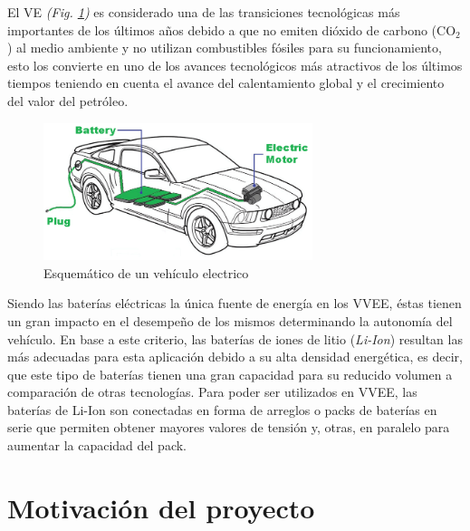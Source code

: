 \documentclass[10pt, a4paper]{report}
\begin{document}
\noindent El \acrfull{VE} \emph{(Fig. \ref{EV})} es considerado 
una de las transiciones tecnológicas más importantes de los últimos años 
debido a que no emiten dióxido de carbono ($\mathrm{CO_2}$) al medio 
ambiente y no utilizan combustibles fósiles para su funcionamiento, esto 
los convierte en uno de los avances tecnológicos más atractivos de los 
últimos tiempos teniendo en cuenta el avance del calentamiento global y el 
crecimiento del valor del petróleo.

\begin{figure}[h!]
    \begin{center}
	\includegraphics[width=0.7\textwidth]{EV.png}
	\caption{Esquem\'atico de un veh\'iculo electrico}
	\label{EV}
    \end{center}
\end{figure}

\noindent Siendo las baterías eléctricas la única fuente de energía en los 
\acrfull{VVEE}, éstas tienen un gran impacto en el desempeño de los mismos 
determinando la autonomía del vehículo. En base a este criterio, las 
baterías de iones de litio (\emph{Li-Ion}) resultan las más adecuadas para 
esta aplicación debido a su alta densidad energética, es decir, que este 
tipo de baterías tienen una gran capacidad para su reducido volumen a 
comparación de otras tecnologías. Para poder ser utilizados en
\acrshort{VVEE}, las baterías de Li-Ion son conectadas en forma de arreglos 
o packs de baterías en serie que permiten obtener mayores valores de tensión
y, otras, en paralelo para aumentar la capacidad del pack.

\newpage

\section{Motivaci\'on del proyecto}
\end{document}

